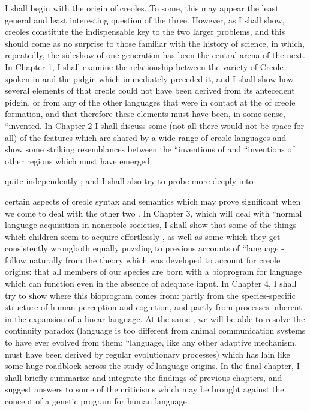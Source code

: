 I shall begin with the origin of creoles. To some, this may appear the least general and least interesting question of the three. However, as I shall show, creoles constitute the indispensable key to the two larger problems, and this should come as no surprise to those familiar with the history of science, in which, repeatedly, the sideshow of one generation has been the central arena of the next. In Chapter 1, I shall examine the relationship between the variety of Creole  spoken in  and the pidgin which immediately preceded it, and I shall show how several elements of that creole could not have been derived from its antecedent pidgin, or from any of the other languages that were in contact at the  of creole formation, and that therefore these elements must have been, in some sense, ``invented. In Chap\-ter 2 I shall discuss some (not all-there would not be space for all) of the features which are shared by a wide range of creole languages and show some striking resemblances between the ``inventions of  and ``inventions of other regions which must have emerged

quite independently ; and I shall also try to probe more deeply into


certain aspects of creole syntax and semantics which may prove signifi\-cant when we come to deal with the other two . In Chapter 3, which will deal with ``normal language acquisition in noncreole societies, I shall show that some of the things which children seem to acquire effortlessly , as well as some which they get consistently wrong\-both equally puzzling to previous accounts of ``language - follow naturally from the theory which was developed to account for creole origins: that all members of our species are born with a bio\-program for language which can function even in the absence of ade\-quate input. In Chapter 4, I shall try to show where this bioprogram comes from: partly from the species-specific structure of human perception and cognition, and partly from processes inherent in the expansion of a linear language. At the same , we will be able to resolve the continuity paradox ({\textquotedbl}language is too different from animal communication systems to have ever evolved from them{\textquotedbl}; ``language, like any other adaptive mechanism, must have been derived by regular evolutionary processes{\textquotedbl}) which has lain like some huge roadblock across the study of language origins. In the final chapter, I shall briefly summarize and integrate the findings of previous chapters, and suggest answers to some of the criticisms which may be brought against the concept of a genetic program for human language.

